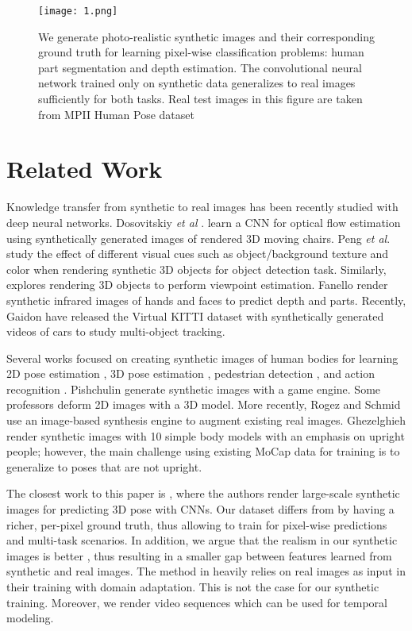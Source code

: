 \documentclass[10pt,twocolumn,a4paper]{article}
\begin{document}
\begin{figure}[htbp]
  \centering
  \texttt{[image: 1.png]}\\
  \caption{We generate photo-realistic synthetic images and their corresponding ground truth for learning pixel-wise classification problems: human part segmentation and depth estimation. The convolutional neural network trained only on synthetic data generalizes to real images sufficiently for both tasks. Real test images in this figure are taken from MPII Human Pose dataset }
  \label{fig1}
\end{figure}

\section{\textbf{Related Work}}
Knowledge transfer from synthetic to real images has been recently studied with deep neural networks. Dosovitskiy \emph{et al} \cite{dosovitskiy2015flownet}.  learn a CNN for optical flow estimation using synthetically generated images of rendered 3D moving chairs. Peng \emph{et al}. \cite{peng2015learning} study the effect of different visual cues such as object/background texture and color when rendering synthetic 3D objects for object detection task. Similarly, explores rendering 3D objects to perform viewpoint estimation. Fanello  render synthetic infrared images of hands and faces to predict depth and parts. Recently, Gaidon  have released the Virtual KITTI dataset with synthetically generated videos of cars to study multi-object tracking.
\par
Several works focused on creating synthetic images of human bodies for learning 2D pose estimation , 3D pose estimation , pedestrian detection , and action recognition . Pishchulin  generate synthetic images with a game engine.  Some professors deform 2D images with a 3D model. More recently, Rogez and Schmid  use an image-based synthesis engine to augment existing real images. Ghezelghieh  render synthetic images with 10 simple body models with an emphasis on upright people; however, the main challenge using existing MoCap data for training is to generalize to poses that are not upright.
\par
The closest work to this paper is \cite{chen2016synthesizing}, where the authors render large-scale synthetic images for predicting 3D pose with CNNs. Our dataset differs from \cite{chen2016synthesizing} by having a richer, per-pixel ground truth, thus allowing to train for pixel-wise predictions and multi-task scenarios. In addition, we argue that the realism in our synthetic images is better , thus resulting in a smaller gap between features learned from synthetic and real images. The method in \cite{chen2016synthesizing} heavily relies on real images as input in their training with domain adaptation. This is not the case for our synthetic training. Moreover, we render video sequences which can be used for temporal modeling.

{\small


}

 
\end{document}
